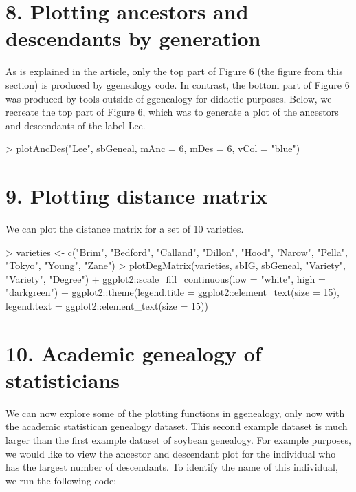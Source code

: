 \documentclass{article}
\begin{document}
\section*{8. Plotting ancestors and descendants by generation}

As is explained in the article, only the top part of Figure 6 (the figure from this section) is produced by ggenealogy code. In contrast, the bottom part of Figure 6 was produced by tools outside of ggenealogy for didactic purposes. Below, we recreate the top part of Figure 6, which was to generate a plot of the ancestors and descendants of the label Lee.

\begin{Schunk}
\begin{Sinput}
> plotAncDes("Lee", sbGeneal, mAnc = 6, mDes = 6, vCol = "blue")
\end{Sinput}
\end{Schunk}

\section*{9. Plotting distance matrix}

We can plot the distance matrix for a set of 10 varieties.

\begin{Schunk}
\begin{Sinput}
> varieties <- c("Brim", "Bedford", "Calland", "Dillon", "Hood", "Narow", "Pella", "Tokyo", "Young", "Zane")
> plotDegMatrix(varieties, sbIG, sbGeneal, "Variety", "Variety", "Degree") + ggplot2::scale_fill_continuous(low = "white", high = "darkgreen") + ggplot2::theme(legend.title = ggplot2::element_text(size = 15), legend.text = ggplot2::element_text(size = 15))
\end{Sinput}
\end{Schunk}

\section*{10. Academic genealogy of statisticians}

We can now explore some of the plotting functions in ggenealogy, only now with the academic statistican genealogy dataset. This second example dataset is much larger than the first example dataset of soybean genealogy. For example purposes, we would like to view the ancestor and descendant plot for the individual who has the largest number of descendants. To identify the name of this individual, we run the following code:
\end{document}
